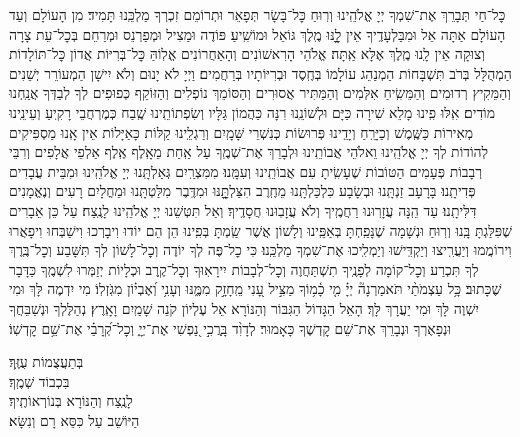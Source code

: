\documentclass[twoside, openany, parskip=half, 11pt]{book}
\begin{document}
\label{nishmas}
כׇּל־חַי תְּבָרֵךְ אֶת־שִׁמְךָ יְיָ אֱלֹהֵֽינוּ וְרֽוּחַ כׇּל־בָּשָׂר תְּפָאֵר וּתְרוֹמֵם זִכְרְךָ מַלְכֵּֽנוּ תָּמִיד׃ מִן הָעוֹלָם וְעַד הָעוֹלָם אַתָּה אֵל וּמִבַּלְעָדֶֽיךָ אֵין לׇׇׇֽנּוּ מֶֽלֶךְ גּוֹאֵל וּמוֹשִֽׁיעַ׃
פּוֹדֶה וּמַצִיל וּמְפַרְנֵס וּמְרַחֵם בְּכׇל־עֵת צָרָה וְצוּקָה אֵין לָֽנוּ מֶֽלֶךְ אֶלָּא אַֽתָּה׃ אֱלֹהֵי הָרִאשׁוֹנִים וְהָאַחֲרוֹנִים אֱלֽוֹהַּ כׇּל־בְּרִיּוֹת אֲדוֹן כׇּל־תּוֹלָדוֹת הַמְהֻלָּל בְּרֹב תִּשְׁבָּחוֹת הַמְנַהֵג עוֹלָמוֹ בְּחֶֽסֶד וּבְרִיּוֹתָיו בְּרַחֲמִים׃ וַיְיָ לֹא יָנוּם וְלֹא יִישָׁן הַמְעוֹרֵר יְשֵׁנִים וְהַמֵּקִיץ רְדוּמִים וְהַמֵּשִֽׂיחַ אִלְּמִים וְהַמַּתִּיר אֲסוּרִים וְהַסּוֹמֵךְ נוֹפְלִים וְהַזּוֹקֵף כְּפוּפִים לְךָ לְבַדְּךָ אֲנַֽחְנוּ מוֹדִים׃ אִֽלּוּ פִֽינוּ מָלֵא שִׁירָה כַּיָּם וּלְשׁוֹנֵֽנוּ רִנָּה כַּהֲמוֹן גַּלָּיו וְשִׂפְתוֹתֵֽינוּ שֶֽׁבַח כְּמֶרְחֲבֵי רָקִֽיעַ וְעֵינֵֽינוּ מְאִירוֹת כַּשֶּֽׁמֶשׁ וְכַיָּרֵֽחַ וְיָדֵֽינוּ פְּרוּשׂוֹת כְּנִשְׁרֵי שָּׁמָֽיִם וְרַגְלֵֽינוּ קַלּוֹת כָּאַיָּלוֹת אֵין אָֽנוּ מַסְפִּיקִים לְהוֹדוֹת לְךָ יְיָ אֱלֹהֵֽינוּ וֵאלֹהֵי אֲבוֹתֵֽינוּ וּלְבָרֵךְ אֶת־שְׁמֶֽךָ עַל אַֽחַת מֵאָֽלֶף אֶֽלֶף אַלְפֵי אֲלָפִים וְרִבֵּי רְבָבוֹת פְּעָמִים הַטּוֹבוֹת שֶׁעָשִֽׂיתָ עִם אֲבוֹתֵֽינוּ וְעִמָּֽנוּ׃ מִמִּצְרַֽיִם גְּאַלְתָּֽנוּ יְיָ אֱלֹהֵֽינוּ וּמִבֵּית עֲבָדִים פְּדִיתָֽנוּ׃ בָּרָעָב זַנְתָּֽנוּ וּבְשָׂבָע כִּלְכַּלְתָּֽנוּ מֵחֶֽרֶב הִצַּלְתׇׇׇּֽנּוּ וּמִדֶּֽבֶר מִלַּטְתָּֽנוּ וּמֵחֳלָיִם רָעִים וְנֶאֱמָנִים דִּלִּיתָֽנוּ׃ עַד הֵֽנָּה עֲזָרֽוּנוּ רַחֲמֶֽיךָ וְלֹא עֲזָבֽוּנוּ חֲסָדֶֽיךָ׃ וְאַל תִּטְּשֵׁנוּ יְיָ אֱלֹהֵֽינוּ לָנֶֽצַח׃ עַל כֵּן אֵבָרִים שֶׁפִּלַּגְתָּ בָּֽנוּ וְרֽוּחַ וּנְשָׁמָה שֶׁנָּפַֽחְתָּ בְּאַפֵּֽינוּ וְלָשׁוֹן אֲשֶׁר שַֽׂמְתָּ בְּפִֽינוּ הֵן הֵם יוֹדוּ וִיבָרְכוּ וִישַׁבְּחוּ וִיפָאֲרוּ וִירוֹמֲמוּ וְיַעֲרִֽיצוּ וְיַקְדִּֽישׁוּ וְיַמְלִֽיכוּ אֶת־שִׁמְךָ מַלְכֵּֽנוּ׃ כִּי כׇל־פֶּה לְךָ יוֹדֶה וְכׇל־לָשׁוֹן לְךָ תִּשָּׁבַע וְכׇל־בֶּֽרֶךְ לְךָ תִּכְרַע וְכׇל־קוֹמָה לְפָנֶֽיךָ תִשְׁתַּחֲוֶה וְכׇל־לְבָבוֹת יִירָאֽוּךָ וְכׇל־קֶֽרֶב וּכְלָיוֹת יְזַמְּרוּ לִשְׁמֶֽךָ כַּדָּבָר שֶׁכָּתוּב׃
כָּ֥ל עַצְמֹתַ֨י תֹּאמַרְנָה֘ יְיָ֗ מִ֤י כָ֫מ֥וֹךָ מַצִּ֣יל עָ֭נִי מֵֽחָזָ֣ק מִמֶּ֑נּוּ וְעָנִ֥י וְ֝אֶבְי֗וֹן מִגֹּֽזְלֽוֹ׃ מִי יִדְמֶה לָּךְ וּמִי יִשְׁוֶה לָּךְ וּמִי יַעֲרָךְ לָּךְ׃ הָאֵל הַגָּדוֹל הַגִּבּוֹר וְהַנּוֹרָא אֵל עֶלְיוֹן קֹנֵה שָׁמַֽיִם וָאָֽרֶץ׃
נְהַלֶּלְךָ וּנְשַׁבֵּחֲךָ וּנְפָאֶרְךָ וּנְבָרֵךְ אֶת־שֵׁם קׇדְשֶׁךָ כָּאָמוּר׃
לְדָוִ֨ד בָּֽרֲכִ֣י נַ֭פְשִׁי אֶת־יְיָ֑ וְכׇל־קְ֝רָבַ֗י אֶת־שֵׁ֥ם קׇדְשֽׁוֹ׃


בְּתַעֲצֻמוֹת עֻזֶּֽךָ׃\\
בִּכְבוֹד שְׁמֶֽךָ׃\\
לָנֶֽצַח וְהַנּוֹרָא בְּנוֹרְאוֹתֶֽיךָ׃\\
הַיּוֹשֵׁב עַל כִּסֵּא רָם וְנִשָּׂא׃
\end{document}
